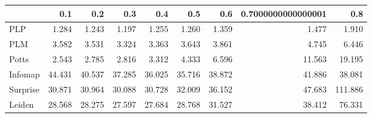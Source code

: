 \begin{tabular}{lrrrrrrrr}
\toprule
{} &    0.1 &    0.2 &    0.3 &    0.4 &    0.5 &    0.6 & 0.7000000000000001 &     0.8 \\
\midrule
PLP      &  1.284 &  1.243 &  1.197 &  1.255 &  1.260 &  1.359 &              1.477 &   1.910 \\
PLM      &  3.582 &  3.531 &  3.324 &  3.363 &  3.643 &  3.861 &              4.745 &   6.446 \\
Potts    &  2.543 &  2.785 &  2.816 &  3.312 &  4.333 &  6.596 &             11.563 &  19.195 \\
Infomap  & 44.431 & 40.537 & 37.285 & 36.025 & 35.716 & 38.872 &             41.886 &  38.081 \\
Surprise & 30.871 & 30.964 & 30.088 & 30.728 & 32.009 & 36.152 &             47.683 & 111.886 \\
Leiden   & 28.568 & 28.275 & 27.597 & 27.684 & 28.768 & 31.527 &             38.412 &  76.331 \\
\bottomrule
\end{tabular}
